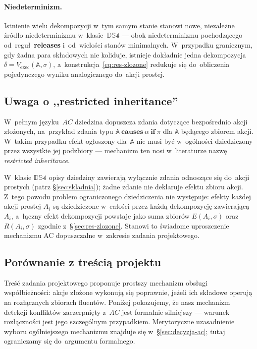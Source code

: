 \documentclass[11pt,a4paper]{article}
\newif\ifshowbib
\newcommand{\bibonly}[1]{\ifshowbib#1\fi}
\renewcommand{\cite}[2][]{\unskip}%
\newcommand{\causes}{\textbf{causes}}
\renewcommand{\iff}{\textbf{if}}
\newcommand{\releases}{\textbf{releases}}
\theoremstyle{definition}
\begin{document}
\paragraph{Niedeterminizm.}
Istnienie wielu dekompozycji w~tym samym stanie stanowi nowe, niezależne
źródło niedeterminizmu w~klasie~$\mathbb{DS4}$ --- obok niedeterminizmu
pochodzącego od~reguł~\releases{} i~od~wielości stanów minimalnych.
W~przypadku granicznym, gdy żadna para składowych nie koliduje,
istnieje dokładnie jedna dekompozycja $\delta = V_{\mathrm{exec}}(\mathbb{A},\sigma)$,
a~konstrukcja~\eqref{eq:res-zlozone} redukuje się do~obliczenia
pojedynczego wyniku analogicznego do~akcji prostej.

\subsection{Uwaga o ,,restricted inheritance''}
\label{sec:restricted-inheritance}

W~pełnym języku~$AC$\bibonly{~\cite{rw05}} dziedzina dopuszcza zdania
dotyczące bezpośrednio akcji złożonych, na~przykład zdania typu
$\mathbb{A}\ \causes\ \alpha\ \iff\ \pi$ dla $\mathbb{A}$ będącego
zbiorem akcji. W~takim przypadku efekt ogłoszony dla~$\mathbb{A}$ nie
musi być w~ogólności dziedziczony przez wszystkie jej podzbiory ---
mechanizm ten nosi w~literaturze nazwę \emph{restricted inheritance}.

W~klasie $\mathbb{DS4}$ opisy dziedziny zawierają wyłącznie zdania
odnoszące się do~akcji prostych (patrz §\ref{sec:skladnia}); żadne zdanie nie deklaruje
efektu zbioru akcji. Z~tego powodu problem ograniczonego dziedziczenia
nie występuje: efekty każdej akcji prostej $A_i$ są dziedziczone w~całości
przez każdą dekompozycję zawierającą~$A_i$, a~łączny efekt dekompozycji
powstaje jako suma zbiorów $E(A_i,\sigma)$ oraz $R(A_i,\sigma)$ zgodnie
z~\S\ref{sec:res-zlozone}. Stanowi to świadome uproszczenie mechanizmu
AC dopuszczalne w~zakresie zadania projektowego.

\subsection{Porównanie z treścią projektu}
\label{sec:porownanie-rozlacznosc}

Treść zadania projektowego\bibonly{~\cite{projekt4}} proponuje prostszy
mechanizm obsługi współbieżności: akcje złożone wykonują się poprawnie,
jeżeli ich składowe operują na rozłącznych zbiorach fluentów. Poniżej
pokazujemy, że nasz mechanizm detekcji konfliktów zaczerpnięty z~$AC$
jest formalnie silniejszy --- warunek rozłączności jest jego szczególnym
przypadkiem. Merytoryczne uzasadnienie wyboru ogólniejszego mechanizmu
znajduje się w~§\ref{sec:decyzja-ac}; tutaj ograniczamy się do~argumentu formalnego.
\end{document}
